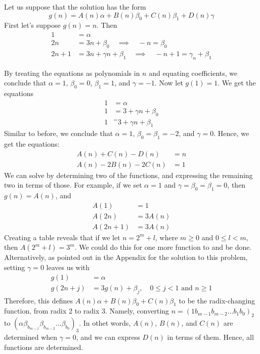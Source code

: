 \documentclass[12pt]{article}
\newenvironment{sol}[1][Solution]{\begin{trivlist}
		\item[\hskip \labelsep {\bfseries #1:}]}{\end{trivlist}}
\begin{document}
\begin{sol}
	Let us suppose that the solution has the form
	\[
	g(n)=A(n)\alpha+B(n)\beta_0+C(n)\beta_1+D(n)\gamma
	\]
	First let's suppose $g(n)=n$. Then
	\begin{align*}
		1 &= \alpha\\
		2n &= 3n + \beta_0\quad\implies\quad -n=\beta_0\\
		2n + 1 &= 3n + \gamma n + \beta_1\quad\implies\quad -n+1=\gamma_n+\beta_1
	\end{align*}
	
	By treating the equations as polynomials in $n$ and equating coefficients,
	we conclude that $\alpha=1$, $\beta_0=0$, $\beta_1=1$, and $\gamma=-1$.
	Now let $g(1)=1$. We get the equations
	\begin{align*}
		1&=\alpha\\
		1&=3+\gamma n+\beta_0\\
		1&^=3+\gamma n+\beta_1
	\end{align*}
	Similar to before, we conclude that $\alpha=1$, $\beta_0=\beta_1=-2$, and $\gamma=0$.
	Hence, we get the equations:
	\begin{align*}
		A(n)+C(n)-D(n)&=n\\
		A(n)-2B(n)-2C(n)&=1
	\end{align*}
	We can solve by determining two of the functions, and expressing
	the remaining two in terms of those. For example, if we
	set $\alpha=1$ and $\gamma=\beta_0=\beta_1=0$, then
	$g(n)=A(n)$, and
	\begin{align*}
		A(1)&=1\\
		A(2n)&=3A(n)\\
		A(2n+1)&=3A(n)
	\end{align*}
	Creating a table reveals that if we let $n=2^{m}+l$, where $m\geq 0$
	and $0\leq l<m$, then $A(2^m+l)=3^m$. We could do this for one more
	function to and be done. Alternatively, as pointed out in the Appendix
	for the solution to this problem, setting $\gamma=0$ leaves us with
	\begin{align*}
		g(1)&=\alpha\\
		g(2n+j)&=3g(n)+\beta_j,\quad 0\leq j<1 \text{ and } n\geq1
	\end{align*}
	Therefore, this defines $A(n)\alpha+B(n)\beta_0+C(n)\beta_1$ to be
	the radix-changing function, from radix 2 to radix 3. Namely, converting $n=(1b_{m-1}b_{m-2}\ldots b_1b_0)_2$ to $(\alpha\beta_{b_{m-1}}\beta_{b_{m-2}}\ldots \beta_{b_0})_3$. In othet words, $A(n)$, $B(n)$, and $C(n)$ are determined
	when $\gamma=0$, and we can express $D(n)$ in terms of them.
	Hence, all functions are determined.
\end{sol}
\end{document}

